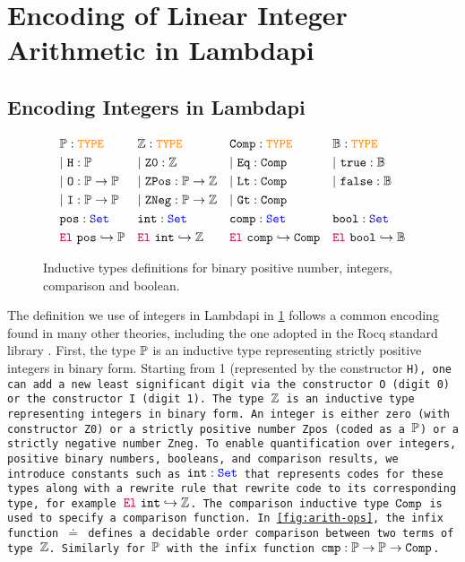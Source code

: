 \section{Encoding of Linear Integer Arithmetic in Lambdapi}
\label{sec:encoding}

\subsection{Encoding Integers in Lambdapi}


\begin{figure}
\centering
\begin{align*}\label{eq:eq1}
&\bb{P}: \type & &\bb{Z}: \type   & &\tt{Comp}: \type & &\bb{B}: \type \\
&|~\tt{H} : \bb{P} & &|~\tt{Z0}: \bb{Z} & &|~\tt{Eq}: \tt{Comp} & &|~\tt{true}: \bb{B} \\
&|~\tt{O}: \bb{P} \ra \bb{P} & &|~\tt{ZPos}: \bb{P} \ra \bb{Z} & &|~\tt{Lt}: \tt{Comp} & &|~\tt{false}: \bb{B} \\
&|~\tt{I}: \bb{P} \ra \bb{P} & &|~\tt{ZNeg}: \bb{P} \ra \bb{Z} & &|~\tt{Gt}: \tt{Comp} & &\\
&\tt{pos}: \set & &\tt{int}: \set & &\tt{comp}: \set & &\tt{bool}: \set \\
&\el~\tt{pos} \re \bb{P} & &\el~\tt{int} \re \bb{Z} & &\el~\tt{comp} \re \tt{Comp} & &\el~\tt{bool} \re \bb{B}
\end{align*}
\caption{Inductive types definitions for binary positive number, integers, comparison and boolean.}
\label{fig:sorts-constructors}
\end{figure}

The definition we use of integers in Lambdapi in \cref{fig:sorts-constructors} follows a common encoding found in many other theories, including the one adopted in the Rocq standard library \cite{Rocq-refman}.
First, the type $\bb{P}$  is an inductive type representing strictly positive integers in binary form.
Starting from 1 (represented by the constructor \tt{H}), one can add a new least significant digit via the constructor \tt{O} (digit 0) or the constructor \tt{I} (digit 1). 
The type $\bb{Z}$ is an inductive type representing integers in binary form.
An integer is either zero (with constructor \tt{Z0}) or a strictly positive number \tt{Zpos} (coded as a $\bb{P}$) or a strictly negative number \tt{Zneg}. %
%
To enable quantification over integers, positive binary numbers, booleans, and comparison results, we introduce constants such as $\tt{int}: \set$ that represents codes for these types along with a rewrite rule that rewrite code to its corresponding type, for example $\el~\tt{int} \re \bb{Z}$.
The comparison inductive type $\tt{Comp}$ is used to specify a comparison function. In \cref{fig:arith-ops}, the infix function $\doteq$ defines a decidable order comparison between two terms of type $\bb{Z}$. Similarly for $\bb{P}$ with the infix function $\tt{cmp}: \bb{P} \ra \bb{P} \ra \tt{Comp}$.

